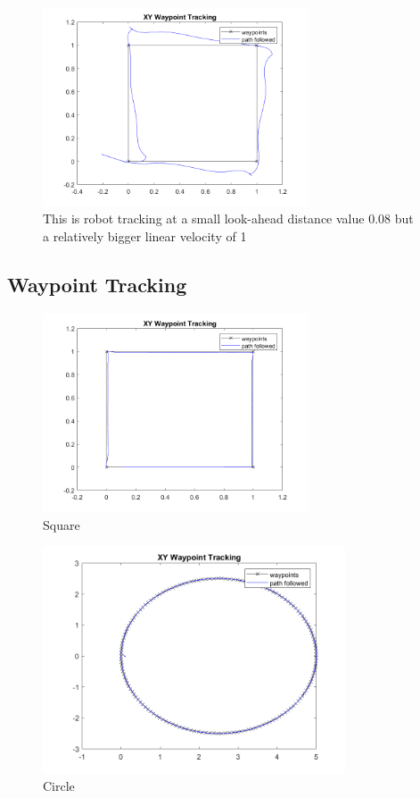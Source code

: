 \documentclass[answers]{exam}
\begin{document}
\begin{questions}
    \begin{figure}[H]
        \centering
        \includegraphics[width=0.7\textwidth]{images/5-discuss.png}
        \caption{This is robot tracking at a small look-ahead distance value 0.08 but a relatively bigger linear velocity of 1}
        \label{fig:my_label}
    \end{figure}

    \subsection*{Waypoint Tracking}

    \begin{figure}[H]
        \centering
        \includegraphics[width=0.7\textwidth]{images/5-square.png}
        \caption{Square}
        \label{fig:my_label}
    \end{figure}

    \begin{figure}[H]
        \centering
        \includegraphics[width=0.8\textwidth]{images/5-circle.png}
        \caption{Circle}
        \label{fig:my_label}
    \end{figure}


\end{questions}
\end{document}

